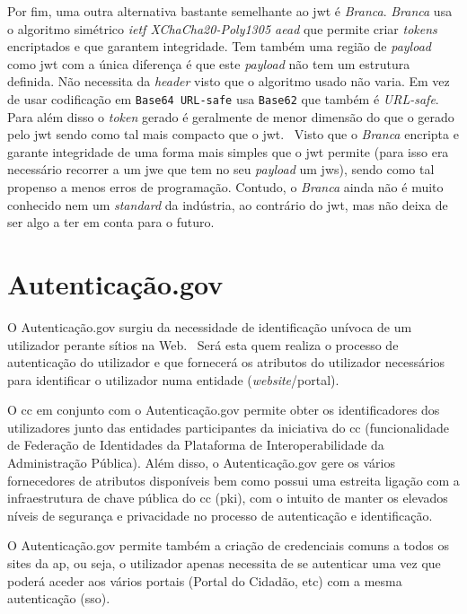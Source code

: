 Por fim, uma outra alternativa bastante semelhante ao \acrshort{jwt} é \textit{Branca}. \textit{Branca} usa o algoritmo simétrico \textit{\acrshort{ietf} XChaCha20-Poly1305 \acrshort{aead}} que permite criar \textit{tokens} encriptados e que garantem integridade. Tem também uma região de \textit{payload} como \acrshort{jwt} com a única diferença é que este \textit{payload} não tem um estrutura definida. Não necessita da \textit{header} visto que o algoritmo usado não varia. Em vez de usar codificação em \texttt{Base64 URL-safe} usa \texttt{Base62} que também é \textit{URL-safe}. Para além disso o \textit{token} gerado é geralmente de menor dimensão do que o gerado pelo \acrshort{jwt} sendo como tal mais compacto que o \acrshort{jwt}.~\cite{branca} Visto que o \textit{Branca} encripta e garante integridade de uma forma mais simples que o \acrshort{jwt} permite (para isso era necessário recorrer a um \acrshort{jwe} que tem no seu \textit{payload} um \acrshort{jws}), sendo como tal propenso a menos erros de programação. Contudo, o \textit{Branca} ainda não é muito conhecido nem um \textit{standard} da indústria, ao contrário do \acrshort{jwt}, mas não deixa de ser algo a ter em conta para o futuro. 

\section{Autenticação.gov}
O Autenticação.gov surgiu da necessidade de identificação unívoca de um utilizador perante sítios na Web.~\cite{agov} Será esta quem realiza o processo de autenticação do utilizador e que fornecerá os atributos do utilizador necessários para identificar o utilizador numa entidade (\textit{website}/portal).

O \acrshort{cc} em conjunto com o Autenticação.gov permite obter os identificadores dos utilizadores junto das entidades participantes da iniciativa do \acrshort{cc} (funcionalidade de Federação de Identidades da Plataforma de Interoperabilidade da Administração Pública). Além disso, o Autenticação.gov gere os vários fornecedores de atributos disponíveis bem como possui uma estreita ligação com a infraestrutura de chave pública do \acrlong{cc} (\acrfull{pki}), com o intuito de manter os elevados níveis de segurança e privacidade no processo de autenticação e identificação.~\cite{agov}

O Autenticação.gov permite também a criação de credenciais comuns a todos os sites da \acrshort{ap}, ou seja, o utilizador apenas necessita de se autenticar uma vez que poderá aceder aos vários portais (Portal do Cidadão, etc) com a mesma autenticação (\acrshort{sso}).

